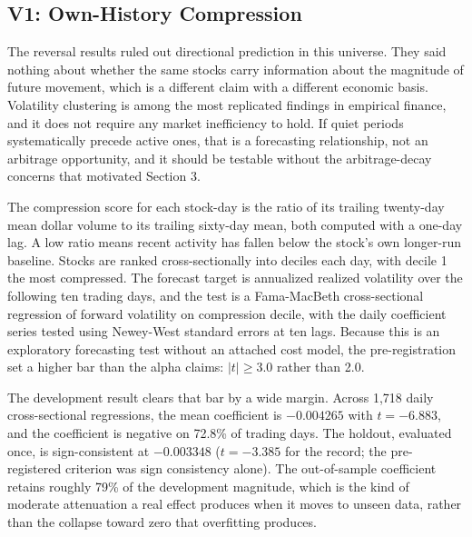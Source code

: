 \documentclass[11pt]{article}
\begin{document}
\subsection{V1: Own-History Compression}

The reversal results ruled out directional prediction in this universe. They said nothing about whether the same stocks carry information about the magnitude of future movement, which is a different claim with a different economic basis. Volatility clustering is among the most replicated findings in empirical finance, and it does not require any market inefficiency to hold. If quiet periods systematically precede active ones, that is a forecasting relationship, not an arbitrage opportunity, and it should be testable without the arbitrage-decay concerns that motivated Section 3.

The compression score for each stock-day is the ratio of its trailing twenty-day mean dollar volume to its trailing sixty-day mean, both computed with a one-day lag. A low ratio means recent activity has fallen below the stock's own longer-run baseline. Stocks are ranked cross-sectionally into deciles each day, with decile 1 the most compressed. The forecast target is annualized realized volatility over the following ten trading days, and the test is a Fama-MacBeth cross-sectional regression of forward volatility on compression decile, with the daily coefficient series tested using Newey-West standard errors at ten lags. Because this is an exploratory forecasting test without an attached cost model, the pre-registration set a higher bar than the alpha claims: $|t| \geq 3.0$ rather than 2.0.

The development result clears that bar by a wide margin. Across 1,718 daily cross-sectional regressions, the mean coefficient is $-0.004265$ with $t = -6.883$, and the coefficient is negative on 72.8\% of trading days. The holdout, evaluated once, is sign-consistent at $-0.003348$ ($t = -3.385$ for the record; the pre-registered criterion was sign consistency alone). The out-of-sample coefficient retains roughly 79\% of the development magnitude, which is the kind of moderate attenuation a real effect produces when it moves to unseen data, rather than the collapse toward zero that overfitting produces.
\end{document}
